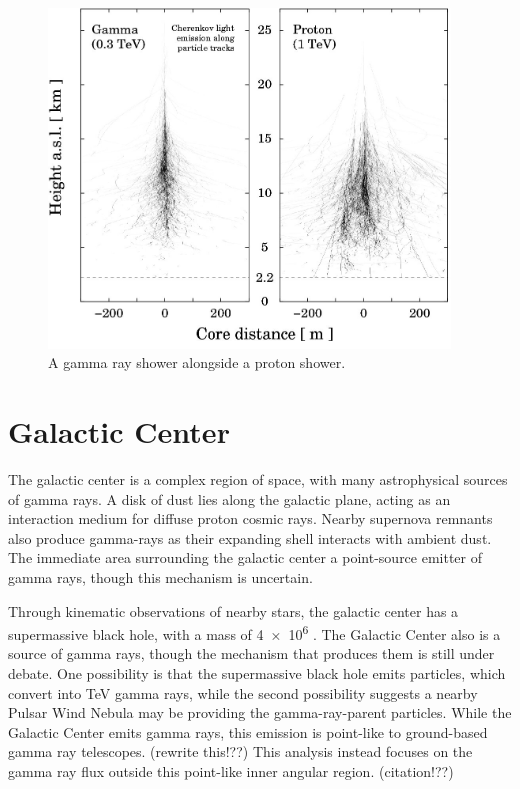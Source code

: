 \begin{figure}[ht]
  \centering
  \includegraphics[width=0.95\textwidth]{images/showers_gamma_proton}
  \caption[Gamma Ray and Proton Showers]{
    A gamma ray shower alongside a proton shower.\cite{Bernlohr2008149}
  }
  \label{fig:gamma_vs_proton_airshower}
\end{figure}


\section{Galactic Center}
The galactic center is a complex region of space, with many astrophysical sources of gamma rays.
A disk of dust lies along the galactic plane, acting as an interaction medium for diffuse proton cosmic rays.
Nearby supernova remnants also produce gamma-rays as their expanding shell interacts with ambient dust.
The immediate area surrounding the galactic center a point-source emitter of gamma rays, though this mechanism is uncertain.

Through kinematic observations of nearby stars, the galactic center has a supermassive black hole, with a mass of \SI{4e6}{\Msol} \cite{sgra_massdist}.
The Galactic Center also is a source of \TeV{} gamma rays, though the mechanism that produces them is still under debate.
One possibility is that the supermassive black hole emits particles, which convert into TeV gamma rays, while the second possibility suggests a nearby Pulsar Wind Nebula may be providing the gamma-ray-parent particles.
While the Galactic Center emits gamma rays, this emission is point-like to ground-based gamma ray telescopes. {\color{red}(rewrite this!??)}
This analysis instead focuses on the gamma ray flux outside this point-like inner angular region. {\color{red}(citation!??)}

